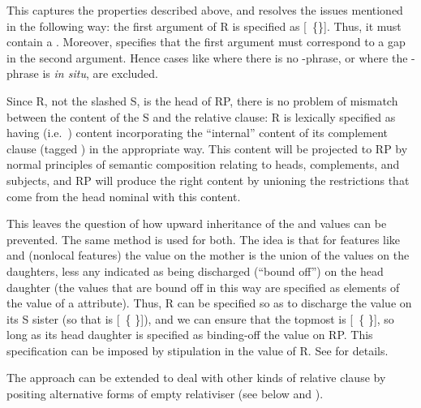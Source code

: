 \documentclass[output=paper,biblatex,babelshorthands,newtxmath,draftmode,colorlinks,citecolor=brown]{langscibook}
\begin{document}
\largerpage[2]
This captures the properties described above, and resolves the issues mentioned in the
following way: the first argument of R is specified as [~\{\}]. Thus, it must contain
a . Moreover,  specifies that the first argument must
correspond to a gap in the second argument. Hence cases like  where there is no
-phrase, or where the -phrase is \emph{in situ}, are excluded.

Since R, not the slashed S, is the head of RP, there is no problem of mismatch between the
content of the S and the relative clause: R is lexically specified as having 
(i.e.\ ) content incorporating the ``internal'' content of its complement clause
(tagged ) in the appropriate way. This  content will be
projected to RP by normal principles of semantic composition relating to heads,
complements, and subjects, and RP will produce the right content by unioning the
restrictions that come from the head nominal with this  content.

This leaves the question of how upward inheritance of the  and 
values can be prevented. The same method is used for both. The idea is that for features
like  and  (nonlocal features) the value on the mother is the
union of the values on the daughters, less any indicated as being discharged
(``bound off'') on the head daughter (the values that are bound off in this way are
specified as elements of the value of a  attribute). Thus, R can be specified so as to discharge the
 value on its S sister (so that  is [~\{ \}]), and we can
ensure that the topmost  is [~\{ \}], so long as its head  daughter is specified as
binding-off the  value on RP. This specification can be imposed by stipulation
in the  value of R.  See  for details.

The approach can be extended to deal with other kinds of relative clause by positing
alternative forms of empty relativiser (see below and \citealt[Chapter~5]{Pollard:Sag:94}).
\end{document}
